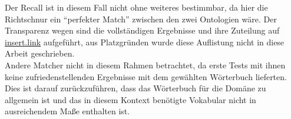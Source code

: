 		Der Recall ist in diesem Fall nicht ohne weiteres bestimmbar, da hier die
		Richtschnur ein "`perfekter Match"' zwischen den zwei Ontologien wäre.
		Der Transparenz wegen sind die vollständigen Ergebnisse und ihre Zuteilung auf
		\url{insert.link} aufgeführt, aus Platzgründen wurde diese Auflistung nicht in
		diese Arbeit geschrieben.\\
		Andere Matcher nicht in diesem Rahmen betrachtet, da erste Tests mit ihnen
		keine zufriedenstellenden Ergebnisse mit dem gewählten Wörterbuch lieferten.
		Dies ist darauf zurückzuführen, dass das Wörterbuch für die Domäne zu
		allgemein ist und das in diesem Kontext benötigte Vokabular nicht in
		ausreichendem Maße enthalten ist.
		
		\pagebreak[4]